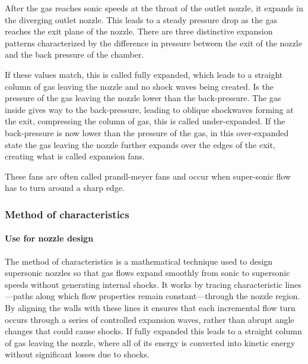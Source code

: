 After the gas reaches sonic speeds at the throat of the outlet nozzle, it expands in the diverging outlet nozzle.
This leads to a steady pressure drop as the gas reaches the exit plane of the nozzle.
There are three distinctive expansion patterns characterized by the difference in pressure between the exit of the nozzle and the back pressure of the chamber.

If these values match, this is called fully expanded, which leads to a straight column of gas leaving the nozzle and no shock waves being created.
Is the pressure of the gas leaving the nozzle lower than the back-pressure.
The gas inside gives way to the back-pressure, leading to oblique shockwaves forming at the exit, compressing the column of gas, this is called under-expanded.
If the back-pressure is now lower than the pressure of the gas, in this over-expanded state the gas leaving the nozzle further expands over the edges of the exit, creating what is called expansion fans.

These fans are often called prandl-meyer fans and occur when super-sonic flow has to turn around a sharp edge.

\subsubsection*{Method of characteristics}

\paragraph*{Use for nozzle design}

The method of characteristics is a mathematical technique used to design supersonic nozzles so that gas flows expand smoothly from sonic to supersonic speeds without generating internal shocks.
It works by tracing characteristic lines—paths along which flow properties remain constant—through the nozzle region.
By aligning the walls with these lines it ensures that each incremental flow turn occurs through a series of controlled expansion waves, rather than abrupt angle changes that could cause shocks.
If fully expanded this leads to a straight column of gas leaving the nozzle, where all of its energy is converted into kinetic energy without significant losses due to shocks.

\paragraph*{}
